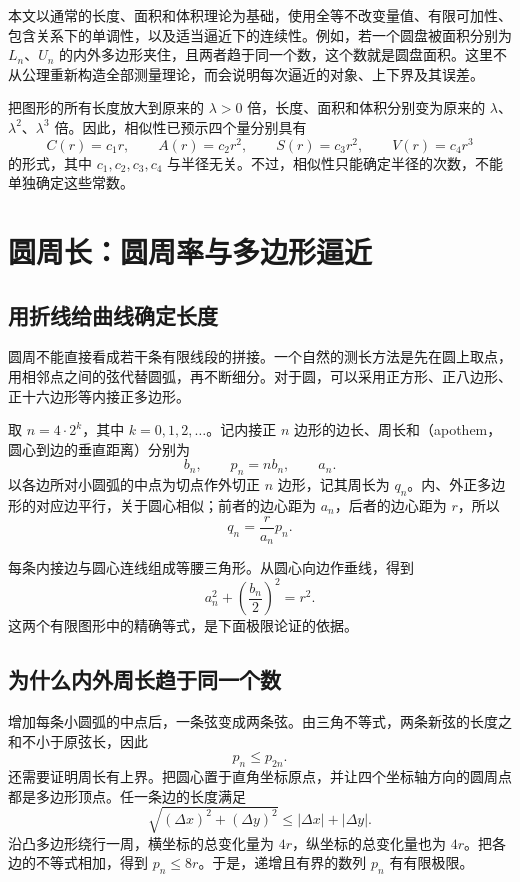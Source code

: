 \documentclass[UTF8]{ctexart}
\begin{document}
本文以通常的长度、面积和体积理论为基础，使用全等不改变量值、有限可加性、包含关系下的单调性，以及适当逼近下的连续性。例如，若一个圆盘被面积分别为 $L_n$、$U_n$ 的内外多边形夹住，且两者趋于同一个数，这个数就是圆盘面积。这里不从公理重新构造全部测量理论，而会说明每次逼近的对象、上下界及其误差。

把图形的所有长度放大到原来的 $\lambda>0$ 倍，长度、面积和体积分别变为原来的 $\lambda$、$\lambda^2$、$\lambda^3$ 倍。因此，相似性已预示四个量分别具有
\[
  C(r)=c_1r,\qquad A(r)=c_2r^2,\qquad
  S(r)=c_3r^2,\qquad V(r)=c_4r^3
\]
的形式，其中 $c_1,c_2,c_3,c_4$ 与半径无关。不过，相似性只能确定半径的次数，不能单独确定这些常数。

\section{圆周长：圆周率与多边形逼近}
\label{sec:cs-circumference}

\subsection{用折线给曲线确定长度}

圆周不能直接看成若干条有限线段的拼接。一个自然的测长方法是先在圆上取点，用相邻点之间的弦代替圆弧，再不断细分。对于圆，可以采用正方形、正八边形、正十六边形等内接正多边形。

取 $n=4\cdot2^k$，其中 $k=0,1,2,\ldots$。记内接正 $n$ 边形的边长、周长和（apothem，圆心到边的垂直距离）分别为
\[
  b_n,\qquad p_n=nb_n,\qquad a_n.
\]
以各边所对小圆弧的中点为切点作外切正 $n$ 边形，记其周长为 $q_n$。内、外正多边形的对应边平行，关于圆心相似；前者的边心距为 $a_n$，后者的边心距为 $r$，所以
\begin{equation}\label{eq:cs-polygon-perimeters}
  q_n=\frac{r}{a_n}p_n.
\end{equation}

每条内接边与圆心连线组成等腰三角形。从圆心向边作垂线，得到
\begin{equation}\label{eq:cs-apothem}
  a_n^2+\left(\frac{b_n}{2}\right)^2=r^2.
\end{equation}
这两个有限图形中的精确等式，是下面极限论证的依据。

\subsection{为什么内外周长趋于同一个数}

增加每条小圆弧的中点后，一条弦变成两条弦。由三角不等式，两条新弦的长度之和不小于原弦长，因此
\[
  p_n\leq p_{2n}.
\]
还需要证明周长有上界。把圆心置于直角坐标原点，并让四个坐标轴方向的圆周点都是多边形顶点。任一条边的长度满足
\[
  \sqrt{(\Delta x)^2+(\Delta y)^2}
  \leq |\Delta x|+|\Delta y|.
\]
沿凸多边形绕行一周，横坐标的总变化量为 $4r$，纵坐标的总变化量也为 $4r$。把各边的不等式相加，得到 $p_n\leq8r$。于是，递增且有界的数列 $p_n$ 有有限极限。
\end{document}
